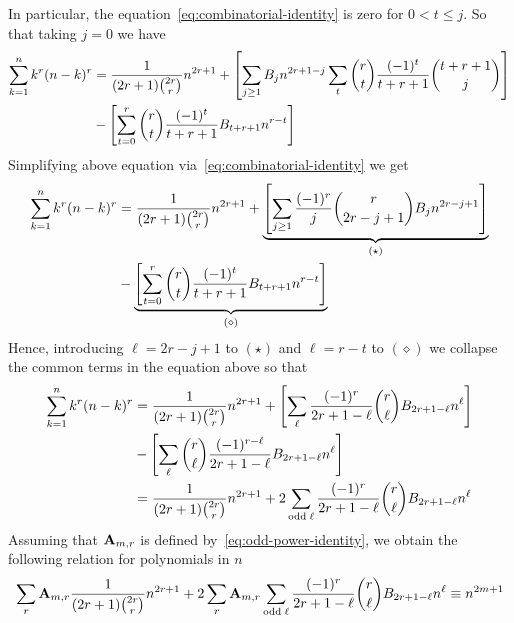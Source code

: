 In particular, the equation~\eqref{eq:combinatorial-identity} is zero for $0< t \leq j$.
So that taking $j=0$ we have
\begin{equation*}
    \begin{split}
        \sum_{k=1}^{n} k^{r} (n-k)^{r}
        &= \frac{1}{(2r+1) \binom{2r}r} n^{2r+1} + \left[ \sum_{j \geq 1} {B}\sb{j} n^{2r+1-j} \sum_{t} \binom{r}{t} \frac{(-1)^t}{t+r+1} \binom{t+r+1}{j} \right] \\
        &- \left[ \sum_{t=0}^{r} \binom{r}{t} \frac{(-1)^t}{t+r+1} {B}\sb{t+r+1} n^{r-t} \right]
    \end{split}
\end{equation*}
Simplifying above equation via~\eqref{eq:combinatorial-identity} we get
\begin{equation*}
    \begin{split}
        \sum_{k=1}^{n} k^{r} (n-k)^{r}
        &= \frac{1}{(2r+1) \binom{2r}r} n^{2r+1}
        + \underbrace{\left[ \sum_{j \geq 1} \frac{(-1)^r}{j} \binom{r}{2r-j+1} {B}\sb{j} n^{2r-j+1} \right]}_{(\star)} \\
        &- \underbrace{\left[ \sum_{t=0}^{r} \binom{r}{t} \frac{(-1)^t}{t+r+1} {B}\sb{t+r+1} n^{r-t} \right]}_{(\diamond)}
    \end{split}
\end{equation*}
Hence, introducing $\ell=2r-j+1$ to $(\star)$ and $\ell=r-t$ to $(\diamond)$
we collapse the common terms in the equation above so that
\begin{equation*}
    \begin{split}
        \sum_{k=1}^{n} k^{r} (n-k)^{r}
        &= \frac{1}{(2r+1) \binom{2r}r} n^{2r+1}
        + \left[ \sum_{\ell} \frac{(-1)^r}{2r+1-\ell} \binom{r}{\ell} {B}\sb{2r+1-\ell} n^{\ell} \right] \\
        &- \left[ \sum_{\ell} \binom{r}{\ell} \frac{(-1)^{r-\ell}}{2r+1-\ell} {B}\sb{2r+1-\ell} n^{\ell} \right]\\
        &= \frac{1}{(2r+1) \binom{2r}r} n^{2r+1} + 2 \sum_{\mathrm{odd \; \ell}} \frac{(-1)^r}{2r+1-\ell} \binom{r}{\ell} {B}\sb{2r+1-\ell} n^{\ell}
    \end{split}
\end{equation*}
Assuming that ${\mathbf{A}} \sb{m,r}$ is defined by~\eqref{eq:odd-power-identity},
we obtain the following relation for polynomials in $n$
\begin{equation*}
    \sum_{r} {\mathbf{A}} \sb{m,r} \frac{1}{(2r+1) \binom{2r}r} n^{2r+1}
    + 2 \sum_{r} {\mathbf{A}} \sb{m,r} \sum_{\mathrm{odd \; \ell}} \frac{(-1)^r}{2r+1-\ell} \binom{r}{\ell} {B}\sb{2r+1-\ell} n^{\ell}
    \equiv n^{2m+1}
\end{equation*}
